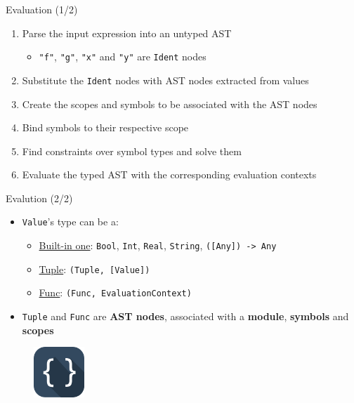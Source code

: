 \documentclass[10pt]{beamer}
\begin{document}
\begin{frame}[fragile]{Evaluation (1/2)}
    \begin{enumerate}
        \setlength\itemsep{1.15em}
        \item Parse the input expression into an untyped AST\vspace{\topsep}\begin{itemize}
            \setlength\itemsep{0.45em}
            \item \texttt{"f"}, \texttt{"g"}, \texttt{"x"} and \texttt{"y"} are \texttt{Ident} nodes
        \end{itemize}
      \item Substitute the \texttt{Ident} nodes with AST nodes extracted from values
      \item Create the scopes and symbols to be associated with the AST nodes
      \item Bind symbols to their respective scope
      \item Find constraints over symbol types and solve them
      \item Evaluate the typed AST with the corresponding evaluation contexts
    \end{enumerate}
\end{frame}

\begin{frame}[fragile]{Evalution (2/2)}
    \begin{itemize}
        \setlength\itemsep{1.15em}
        \item \texttt{Value}'s type can be a:\vspace{\topsep}\begin{itemize}
            \setlength\itemsep{0.45em}
            \item \underline{Built-in one}: \texttt{Bool}, \texttt{Int}, \texttt{Real}, \texttt{String}, \texttt{([Any]) -> Any}
            \item \underline{Tuple}: \texttt{(Tuple, [Value])}
            \item \underline{Func}: \texttt{(Func, EvaluationContext)}
        \end{itemize}
      \item \texttt{Tuple} and \texttt{Func} are \textbf{AST nodes}, associated with a \textbf{module}, \textbf{symbols} and \textbf{scopes}
    \end{itemize}
    \begin{figure}
        \centering
        \includegraphics[width=0.17\textwidth]{04scope.png}
    \end{figure}
\end{frame}
\end{document}
